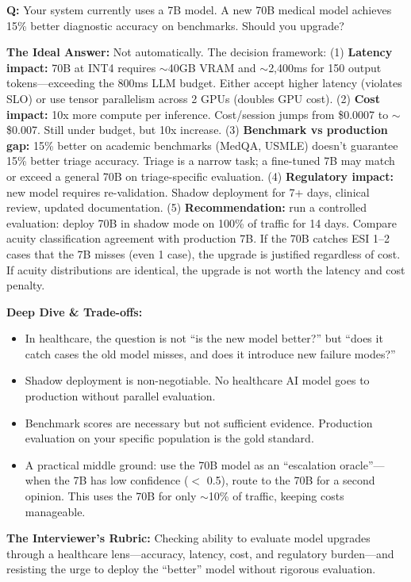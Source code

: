 \textbf{Q:} Your system currently uses a 7B model. A new 70B medical model achieves 15\% better diagnostic accuracy on benchmarks. Should you upgrade?

\textbf{The Ideal Answer:} Not automatically. The decision framework: (1) \textbf{Latency impact:} 70B at INT4 requires $\sim$40GB VRAM and $\sim$2,400ms for 150 output tokens---exceeding the 800ms LLM budget. Either accept higher latency (violates SLO) or use tensor parallelism across 2 GPUs (doubles GPU cost). (2) \textbf{Cost impact:} 10x more compute per inference. Cost/session jumps from \$0.0007 to $\sim$\$0.007. Still under budget, but 10x increase. (3) \textbf{Benchmark vs production gap:} 15\% better on academic benchmarks (MedQA, USMLE) doesn't guarantee 15\% better triage accuracy. Triage is a narrow task; a fine-tuned 7B may match or exceed a general 70B on triage-specific evaluation. (4) \textbf{Regulatory impact:} new model requires re-validation. Shadow deployment for 7+ days, clinical review, updated documentation. (5) \textbf{Recommendation:} run a controlled evaluation: deploy 70B in shadow mode on 100\% of traffic for 14 days. Compare acuity classification agreement with production 7B. If the 70B catches ESI 1--2 cases that the 7B misses (even 1 case), the upgrade is justified regardless of cost. If acuity distributions are identical, the upgrade is not worth the latency and cost penalty.

\textbf{Deep Dive \& Trade-offs:}
\begin{itemize}
  \item In healthcare, the question is not ``is the new model better?'' but ``does it catch cases the old model misses, and does it introduce new failure modes?''
  \item Shadow deployment is non-negotiable. No healthcare AI model goes to production without parallel evaluation.
  \item Benchmark scores are necessary but not sufficient evidence. Production evaluation on your specific population is the gold standard.
  \item A practical middle ground: use the 70B model as an ``escalation oracle''---when the 7B has low confidence ($<$ 0.5), route to the 70B for a second opinion. This uses the 70B for only $\sim$10\% of traffic, keeping costs manageable.
\end{itemize}

\textbf{The Interviewer's Rubric:} Checking ability to evaluate model upgrades through a healthcare lens---accuracy, latency, cost, and regulatory burden---and resisting the urge to deploy the ``better'' model without rigorous evaluation.

